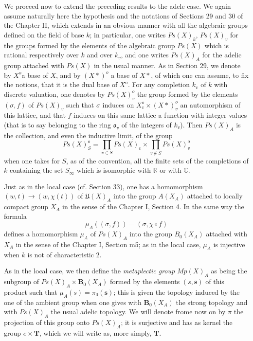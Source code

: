 \documentclass[12pt]{amsart}
\newcounter{ssection}
\renewcommand{\subsection}{
  \addtocounter{ssection}{1}{\bf  \arabic{ssection}.\  }}
\begin{document}
\subsection{}
We proceed now to extend the preceding results to the adele case.
We again assume naturally here the hypothesis and the notations of
Sections 29 and 30 of the Chapter II, which extends in an obvious
manner with all the algebraic groups defined on the field of base
$k$; in particular, one writes $Ps(X)_{k}$, $Ps(X)_{v}$ for the
groups formed by the elements of the algebraic group $Ps(X)$ which
is rational respectively over $k$ and over $k_{v}$, and one writes
$Ps(X)_{A}$ for the adelic group attached with $Ps(X)$ in the usual
manner. As in Section 29, we denote by $X^{o}$a base of $X$, and
by $(X*)^{o}$ a base of $X*$, of which one can assume, to fix the
notions, that it is the dual base of $X^{o}$. For any completion
$k_{v}$ of $k$ with discrete valuation, one denotes by $Ps(X)_{v}^{o}$
the group formed by the elements $(\sigma,f)$ of $Ps(X)_{v}$ such
that $\sigma$ induces on $X_{v}^{o}\times(X*)_{v}^{o}$ an automorphism
of this lattice, and that $f$ induces on this same lattice a function
with integer values (that is to say belonging to the ring $\mathfrak{o}_{v}$
of the integers of $k_{v}$). Then $Ps(X)_{A}$ is the collection,
and even the inductive limit, of the group\[
Ps(X)_{S}^{o}=\prod_{v\in S}Ps(X)_{v}\times\prod_{v\notin S}Ps(X)_{v}^{o}\]
when one takes for $S$, as of the convention, all the finite sets
of the completions of $k$ containing the set $S_{\infty}$ which
is isomorphic with $\mathbb{R}$ or with $\mathbb{C}$.

Just as in the local case (cf. Section 33), one has a homomorphism
$(w,t)\to(w,\chi(t))$ of $\mathfrak{U}(X)_{A}$ into the group $A(X_{A})$
attached to locally compact group $X_{A}$ in the sense of the Chapter
I, Section 4. In the same way the formula\[
\mu_{A}((\sigma,f))=(\sigma,\chi\circ f)\]
defines a homomorphism $\mu_{A}$ of $Ps(X)_{A}$ into the group $B_{0}(X_{A})$
attached with $X_{A}$ in the sense of the Chapter I, Section m5;
as in the local case, $\mu_{A}$ is injective when $k$ is not of
characteristic $2$.

As in the local case, we then define the \emph{metaplectic group}
$Mp(X)_{A}$ as being the subgroup of $Ps(X)_{A}\times\mathbf{B}_{0}(X_{A})$
formed by the elements $(s,\mathbf{s})$ of this product such that
$\mu_{A}(s)=\pi_{0}(\mathbf{s})$; this is given the topology induced
by the one of the ambient group when one gives with $\mathbf{B}_{0}(X_{A})$
the strong topology and with $Ps(X)_{A}$ the usual adelic topology.
We will denote frome now on by $\pi$ the projection of this group
onto $Ps(X)_{A}$; it is surjective and has as kernel the group ${e}\times\mathbf{T}$,
which we will write as, more simply, $\mathbf{T}$.

\subsection{}
\end{document}

